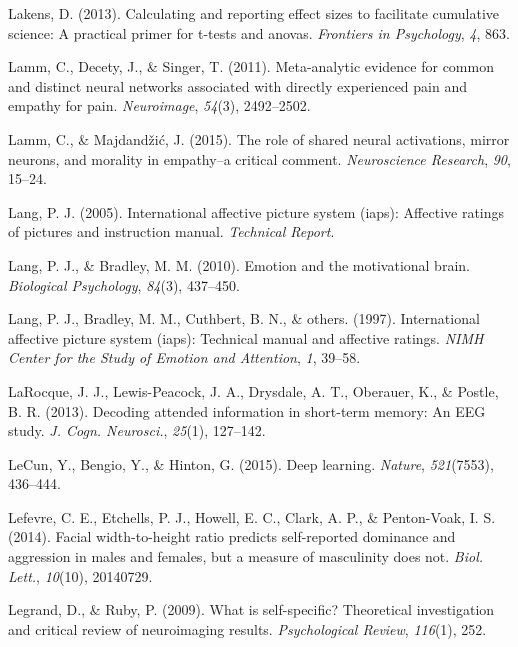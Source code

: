 \documentclass[11pt,american,a4paper,oneside,]{memoir} %
\begin{document}
\leavevmode\hypertarget{ref-lakens2013calculating}{}%
Lakens, D. (2013). Calculating and reporting effect sizes to facilitate cumulative science: A practical primer for t-tests and anovas. \emph{Frontiers in Psychology}, \emph{4}, 863.

\leavevmode\hypertarget{ref-lamm2011meta}{}%
Lamm, C., Decety, J., \& Singer, T. (2011). Meta-analytic evidence for common and distinct neural networks associated with directly experienced pain and empathy for pain. \emph{Neuroimage}, \emph{54}(3), 2492--2502.

\leavevmode\hypertarget{ref-lamm2015role}{}%
Lamm, C., \& Majdandžić, J. (2015). The role of shared neural activations, mirror neurons, and morality in empathy--a critical comment. \emph{Neuroscience Research}, \emph{90}, 15--24.

\leavevmode\hypertarget{ref-lang2005international}{}%
Lang, P. J. (2005). International affective picture system (iaps): Affective ratings of pictures and instruction manual. \emph{Technical Report}.

\leavevmode\hypertarget{ref-lang2010emotion}{}%
Lang, P. J., \& Bradley, M. M. (2010). Emotion and the motivational brain. \emph{Biological Psychology}, \emph{84}(3), 437--450.

\leavevmode\hypertarget{ref-lang1997international}{}%
Lang, P. J., Bradley, M. M., Cuthbert, B. N., \& others. (1997). International affective picture system (iaps): Technical manual and affective ratings. \emph{NIMH Center for the Study of Emotion and Attention}, \emph{1}, 39--58.

\leavevmode\hypertarget{ref-LaRocque2013-sh}{}%
LaRocque, J. J., Lewis-Peacock, J. A., Drysdale, A. T., Oberauer, K., \& Postle, B. R. (2013). Decoding attended information in short-term memory: An EEG study. \emph{J. Cogn. Neurosci.}, \emph{25}(1), 127--142.

\leavevmode\hypertarget{ref-LeCun2015-xa}{}%
LeCun, Y., Bengio, Y., \& Hinton, G. (2015). Deep learning. \emph{Nature}, \emph{521}(7553), 436--444.

\leavevmode\hypertarget{ref-Lefevre2014-vo}{}%
Lefevre, C. E., Etchells, P. J., Howell, E. C., Clark, A. P., \& Penton-Voak, I. S. (2014). Facial width-to-height ratio predicts self-reported dominance and aggression in males and females, but a measure of masculinity does not. \emph{Biol. Lett.}, \emph{10}(10), 20140729.

\leavevmode\hypertarget{ref-legrand2009self}{}%
Legrand, D., \& Ruby, P. (2009). What is self-specific? Theoretical investigation and critical review of neuroimaging results. \emph{Psychological Review}, \emph{116}(1), 252.
\end{document}
